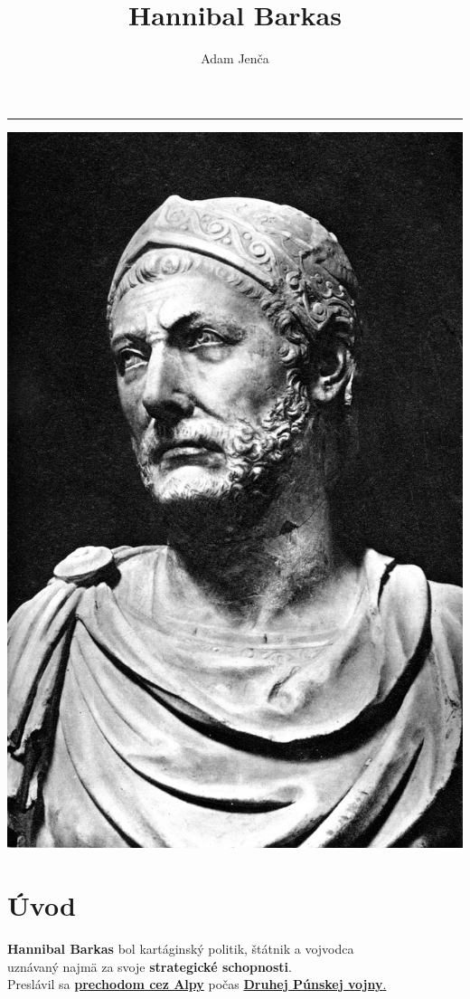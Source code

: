 \documentclass{article}
\title{Hannibal Barkas}
\author{Adam Jenča}
\begin{document}
\maketitle
\begin{center}
\hrule
\medskip
\center
\includegraphics[scale=0.5]{hannibal_busta.jpg}
\end{center}
\newpage

\tableofcontents
\bigskip
\section{Úvod}

\textbf{Hannibal Barkas} bol kartáginský politik, štátnik a vojvodca\\
uznávaný najmä za svoje \textbf{strategické schopnosti}. \\
Preslávil sa 
\hyperref[subsubsec:alpine]{\textbf{prechodom cez Alpy}} počas 
\hyperref[subsec:secondpunianwar]{\textbf{Druhej Púnskej vojny}.}\\\\
\noindent
\end{document}
